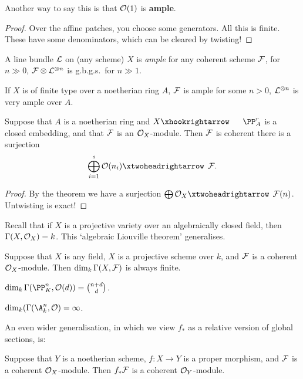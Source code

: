 \documentclass[11pt]{article}
\begin{document}
\begin{Nov3}
\begin{thm*}[Serre]
Another way to say this is that $\mathcal{O}(1)$ is \textbf{ample}.
\end{thm*}
\begin{proof}
Over the affine patches, you choose some generators. All this is finite. These have some denominators, which can be cleared by twisting!
\end{proof}
\begin{defn*}
A line bundle $\mathcal{L}$ on (any scheme) $X$ is \emph{ample} \Iff for any coherent scheme $\mathcal{F}$, for $n\gg0$, $\mathcal{F}\otimes\mathcal{L}^{\otimes n}$ is g.b.g.s.\ for $n\gg1$. 
\end{defn*}
\begin{thm*}[II.7.6]
If $X$ is of finite type over a noetherian ring $A$, $\mathcal{F}$ is ample \Iff for some $n>0$, $\mathcal{L}^{\otimes n}$ is very ample over $A$.
\end{thm*}
\begin{cor*}
Suppose that $A$ is a noetherian ring and $X\cofibration \PP^r_A$ is a closed embedding, and that $\mathcal{F}$ is an $\mathcal{O}_X$-module. Then $\mathcal{F}$ is  coherent \Iff there is a surjection
\[\bigoplus_{i=1}^s\calO(n_i)\fibration\calF.\]
\end{cor*}
\begin{proof}
By the theorem we have a surjection $\bigoplus \calO_X\fibration \calF(n)$. Untwisting is exact!
\end{proof}
Recall that if $X$ is a projective variety over an algebraically closed field, then $\Gamma(X,\mathcal{O}_X)=k$. This `algebraic Liouville theorem' generalises.
\begin{prop*}
Suppose that $X$ is any field, $X$ is a projective scheme over $k$, and $\mathcal{F}$ is a coherent $\mathcal{O}_X$-module. Then $\dim_k\Gamma(X,\mathcal{F})$ is always finite.
\end{prop*}
\begin{exmp*}
$\dim_k\Gamma(\PP^n_K,\calO(d))={n+d\choose d}$.
\end{exmp*}
\begin{exmp*}
$\dim_k(\Gamma(\A^n_k,\calO)=\infty$.
\end{exmp*}
An even wider generalisation, in which we view $f_*$ as a relative version of global sections, is:
\begin{prop*}[Grothendieck]
Suppose that $Y$ is a noetherian scheme, $f:X\to Y$ is a proper morphism, and $\mathcal{F}$ is a coherent $\mathcal{O}_X$-module. Then $f_*\mathcal{F}$ is a coherent $\mathcal{O}_Y$-module.
\end{prop*}
\end{Nov3}
\end{document}
